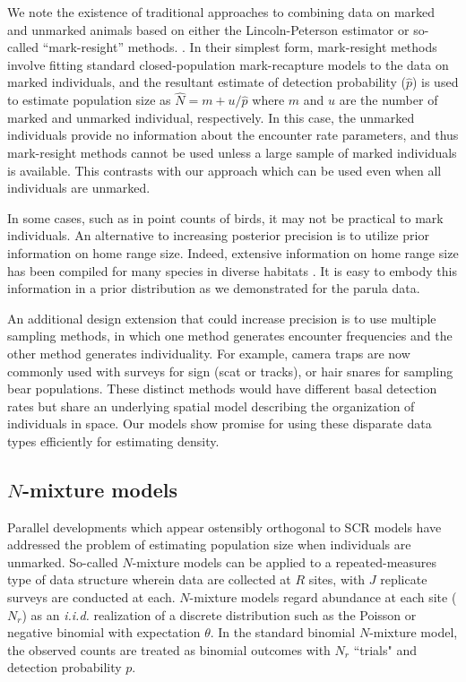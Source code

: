 We note the existence of traditional approaches to combining data on
marked and unmarked animals based on either the Lincoln-Peterson
estimator or so-called ``mark-resight'' methods.
\citep{bartmannEA:87, mintaMangel:89, mcclintockHoeting:09}. In their
simplest form, mark-resight methods involve fitting standard
closed-population mark-recapture models to the data on marked
individuals, and the resultant estimate of detection probability
($\hat{p}$) is used to estimate population size as $\hat{N} = m +
u/\hat{p}$ where $m$ and $u$ are the number of
marked and unmarked individual, respectively. In this case,
the unmarked individuals provide no information about the
encounter rate parameters, and thus mark-resight methods cannot be
used unless a large sample of marked individuals is available. This
contrasts with our approach which can be used even when all
individuals are unmarked.

In some cases, such as in point counts of birds, it may not be
practical to mark individuals. An alternative to increasing posterior
precision is to utilize prior information on
home range size. Indeed, extensive information on home range size has
been compiled for many species in diverse habitats %
\citep[\emph{e.g.},][]{degraafYamasaki:01}. It is
easy to embody this information in a prior distribution as we
demonstrated for the parula data.

An additional design extension that could increase precision is to use
multiple sampling methods, in which one method generates encounter
frequencies and the other method generates individuality.
For example, camera traps are now commonly used with surveys for
sign (scat or tracks), or hair snares for sampling bear populations.
These distinct methods would have different basal detection
rates but share an underlying spatial model describing the
organization of individuals in space.
Our models show promise for using
these disparate data types efficiently
for estimating density.


\subsection{$N$-mixture models}

Parallel developments which appear ostensibly
orthogonal to SCR models have addressed the problem of estimating
population size when individuals are unmarked. So-called
$N$-mixture models \citep{royle04a, royle04b, royle_distsamp_2004}
can be applied to a repeated-measures type of data structure
wherein  data are collected at $R$ sites, with $J$
replicate surveys are conducted at each.
$N$-mixture models regard abundance at each site ($N_r$) as an
{\it i.i.d.} realization of a discrete distribution such as the
Poisson or negative binomial with expectation $\theta$. In the
standard binomial $N$-mixture model, the observed counts are
treated as binomial outcomes with $N_r$ ``trials" and detection
probability $p$.

